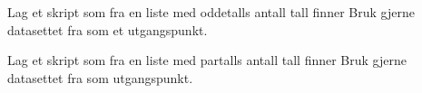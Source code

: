 




\opgt
\begin{comment}
	\op{opgsortlist}
	Definer listene 
	\alg{
	&\texttt{siffer = [2, 0, 3, 5, 7, 8, 6, 9, 4]}	\\
	&\texttt{bokstaver = ['b', 'f', 'd', 'c', 'e', 'a', 'g']
	}
	}
	Gjør følgende for hver av de to listene:
	\abc{
	\item Print elev
	}
\end{comment}
	
Lag et skript som fra en liste med oddetalls antall tall finner
Bruk gjerne datasettet fra  som et utgangspunkt.

Lag et skript som fra en liste med partalls antall tall finner
Bruk gjerne datasettet fra  som utgangspunkt.






